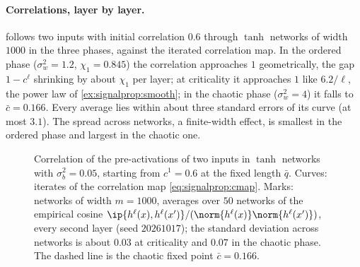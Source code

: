\begin{refsection}
\paragraph{Correlations, layer by layer.}  follows two inputs with initial correlation $0.6$ through $\tanh$ networks of width $1000$ in the three phases, against the iterated correlation map. In the ordered phase ($\sigma_w^2=1.2$, $\chi_1=0.845$) the correlation approaches $1$ geometrically, the gap $1-c^\ell$ shrinking by about $\chi_1$ per layer; at criticality it approaches $1$ like $6.2/\ell$, the power law of \cref{ex:signalprop:smooth}; in the chaotic phase ($\sigma_w^2=4$) it falls to $\bar c=0.166$. Every average lies within about three standard errors of its curve (at most $3.1$). The spread across networks, a finite-width effect, is smallest in the ordered phase and largest in the chaotic one.

\begin{figure}[t]
\centering
{}
\caption{Correlation of the pre-activations of two inputs in $\tanh$ networks with $\sigma_b^2=0.05$, starting from $c^1=0.6$ at the fixed length $\bar q$. Curves: iterates of the correlation map \eqref{eq:signalprop:cmap}. Marks: networks of width $m=1000$, averages over $50$ networks of the empirical cosine $\ip{h^\ell(x),h^\ell(x')}/(\norm{h^\ell(x)}\norm{h^\ell(x')})$, every second layer (seed $20261017$); the standard deviation across networks is about $0.03$ at criticality and $0.07$ in the chaotic phase. The dashed line is the chaotic fixed point $\bar c=0.166$.}
\label{fig:signalprop:corr}
\end{figure}


\end{refsection}
